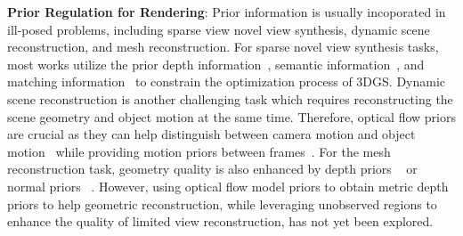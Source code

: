 %
\textbf{Prior Regulation for Rendering}:
Prior information is usually incoporated in ill-posed problems,
including sparse view novel view synthesis, dynamic scene reconstruction,
and mesh reconstruction.
For sparse novel view synthesis tasks, most works utilize the prior depth information~\citep{deng2022depth, roessle2022dense, song2024darf, wang2023sparsenerf, zhu2023fsgs, xiong2023sparsegs, paliwal2024coherentgs}, semantic information~\citep{jain2021putting, wynn2023diffusionerf, xiong2023sparsegs}, and matching information~\citep{paliwal2024coherentgs, lao2024corresnerf} 
to constrain the optimization process of 3DGS.
Dynamic scene reconstruction is another challenging
task which requires reconstructing the scene geometry and object motion at the same
time. 
Therefore, optical flow priors are crucial as
they can help distinguish between camera motion 
and object motion~\citep{liu2023robust} 
while providing motion priors between frames~\citep{Liu_2023_CVPR, gao2021dynamic, li2023dynibar, 
wang2023flow, guo2023forward, tian2023mononerf}.
For the mesh reconstruction task,
geometry quality is also
enhanced by depth priors  
~\citep{wei2021nerfingmvs, yu2022monosdf, turkulainen2024dn} 
or normal priors ~\citep{yu2022monosdf, turkulainen2024dn}. 
%
However, using optical flow model priors to obtain metric depth priors 
to help geometric reconstruction, 
while leveraging unobserved regions to enhance the quality 
of limited view reconstruction, has not yet been explored.
%